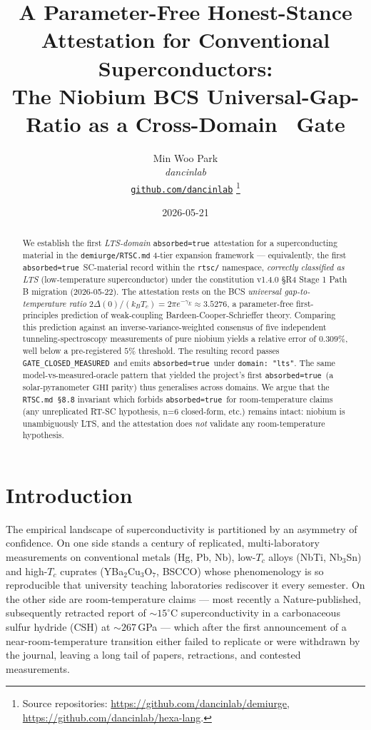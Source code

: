 \documentclass[11pt,a4paper]{article}
\title{
  \textbf{A Parameter-Free Honest-Stance Attestation for Conventional Superconductors:}\\[4pt]
  The Niobium BCS Universal-Gap-Ratio as a Cross-Domain \absorbedtrue\ Gate
}
\author{
  Min Woo Park\\
  \normalsize\textit{dancinlab}\\[2pt]
  \normalsize\href{https://github.com/dancinlab}{\texttt{github.com/dancinlab}}
  \thanks{Source repositories:
    \url{https://github.com/dancinlab/demiurge},
    \url{https://github.com/dancinlab/hexa-lang}.}
}
\date{2026-05-21}
\newcommand{\absorbedtrue}{\textcolor{honestgreen}{\texttt{absorbed=true}}}
\newcommand{\gateclosedmeas}{\texttt{GATE\_CLOSED\_MEASURED}}
\begin{document}
\maketitle

\begin{abstract}
We establish the first \emph{LTS-domain} \absorbedtrue\ attestation
for a superconducting material in the \texttt{demiurge/RTSC.md}
4-tier expansion framework --- equivalently, the first
\absorbedtrue\ SC-material record within the \texttt{rtsc/} namespace,
\emph{correctly classified as LTS} (low-temperature superconductor)
under the constitution v1.4.0 \S R4 Stage 1 Path B migration
(2026-05-22).
The attestation rests on the BCS \emph{universal gap-to-temperature ratio}
\(2\Delta(0)/(k_{B} T_{c}) = 2\pi e^{-\gamma_{E}} \approx 3.5276\),
a parameter-free first-principles prediction of weak-coupling Bardeen-Cooper-Schrieffer
theory. Comparing this prediction against an inverse-variance-weighted consensus
of five independent tunneling-spectroscopy measurements of pure niobium
yields a relative error of \(0.309\%\), well below a pre-registered
\(5\%\) threshold. The resulting record passes \gateclosedmeas\ and
emits \absorbedtrue\ under \texttt{domain: "lts"}.  The same
model-vs-measured-oracle pattern that yielded the project's first
\absorbedtrue\ (a solar-pyranometer \(\text{GHI}\) parity) thus
generalises across domains. We argue that the \texttt{RTSC.md \S 8.8}
invariant which forbids \absorbedtrue\ for room-temperature claims
(any unreplicated RT-SC hypothesis, n=6 closed-form, etc.) remains
intact: niobium is unambiguously LTS, and the attestation does
\emph{not} validate any room-temperature hypothesis.
\end{abstract}

\section{Introduction}
\label{sec:intro}

The empirical landscape of superconductivity is partitioned by an
asymmetry of confidence. On one side stands a century of replicated,
multi-laboratory measurements on conventional metals (Hg, Pb, Nb), low-$T_c$
alloys (NbTi, Nb$_3$Sn) and high-$T_c$ cuprates (YBa$_2$Cu$_3$O$_7$, BSCCO)
whose phenomenology is so reproducible that university teaching laboratories
rediscover it every semester. On the other side are room-temperature
claims --- most recently a Nature-published, subsequently retracted
report of \(\sim 15^\circ\)C superconductivity in a carbonaceous sulfur
hydride (CSH) at $\sim 267$\,GPa \cite{snider2020csh,snider2022retraction,hirsch2022csh} ---
which after the first announcement of a near-room-temperature transition
either failed to replicate or were withdrawn by the journal, leaving
a long tail of papers, retractions, and contested measurements.
\end{document}

